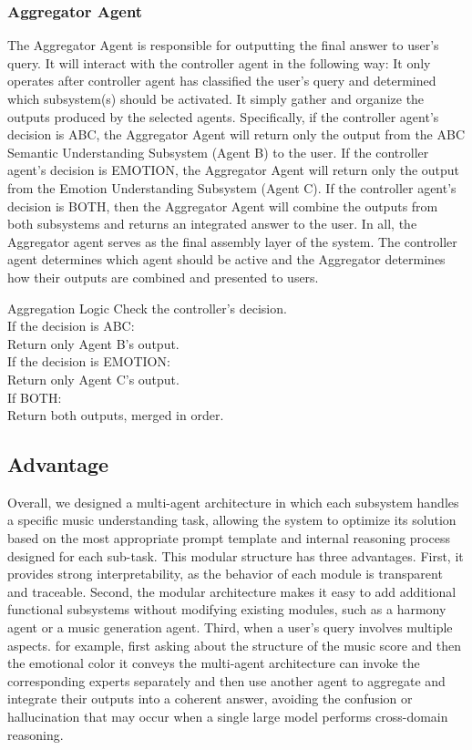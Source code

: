 \documentclass[sigconf]{acmart}
\begin{document}
\subsubsection{Aggregator Agent}
The Aggregator Agent is responsible for outputting the final answer to user's query. It will interact with the controller agent in the following way: It only operates after controller agent has classified the user's query and determined which subsystem(s) should be activated. It simply gather and organize the outputs produced by the selected agents. Specifically, if the controller agent's decision is ABC, the Aggregator Agent will return only the output from the ABC Semantic Understanding Subsystem (Agent B) to the user. If the controller agent’s decision is EMOTION, the Aggregator Agent will return only the output from the Emotion Understanding Subsystem (Agent C). If the controller agent’s decision is BOTH, then the Aggregator Agent will combine the outputs from both subsystems and returns an integrated answer to the user. In all, the Aggregator agent serves as the final assembly layer of the system. The controller agent determines which agent should be active and the Aggregator determines how their outputs are combined and presented to users. 
\begin{promptbox}{Aggregation Logic}
Check the controller's decision. \\ 

If the decision is ABC:\\
    Return only Agent B's output.\\

If the decision is EMOTION:\\
    Return only Agent C's output.\\

If BOTH:\\
    Return both outputs, merged in order.\\
\end{promptbox}

\subsection{Advantage}
Overall, we designed a multi-agent architecture in which each subsystem handles a specific music understanding task, allowing the system to optimize its solution based on the most appropriate prompt template and internal reasoning process designed for each sub-task. This modular structure has three advantages. First, it provides strong interpretability, as the behavior of each module is transparent and traceable. Second, the modular architecture makes it easy to add additional functional subsystems without modifying existing modules, such as a harmony agent or a music generation agent. Third, when a user’s query involves multiple aspects. for example, first asking about the structure of the music score and then the emotional color it conveys the multi-agent architecture can invoke the corresponding experts separately and then use another agent to aggregate and integrate their outputs into a coherent answer, avoiding the confusion or hallucination that may occur when a single large model performs cross-domain reasoning.
\end{document}
